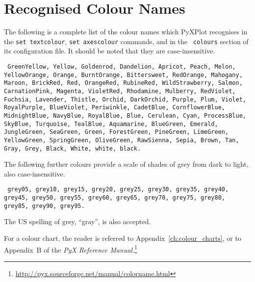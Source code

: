 \section{Recognised Colour Names}
\label{sec:colour_names}

The following is a complete list of the colour names which PyXPlot recognises
in the {\tt set textcolour}, {\tt set axescolour} commands, and in the {\tt
colours} section of its configuration file. It should be noted that they are
case-insensitive.

\vspace{5mm}\noindent
{}
{\tt
GreenYellow, Yellow, Goldenrod, Dandelion, Apricot, Peach, Melon, YellowOrange, Orange, BurntOrange, Bittersweet, RedOrange, Mahogany, Maroon, BrickRed, Red, OrangeRed, RubineRed, WildStrawberry, Salmon, CarnationPink, Magenta, VioletRed, Rhodamine, Mulberry, RedViolet, Fuchsia, Lavender, Thistle, Orchid, DarkOrchid, Purple, Plum, Violet, RoyalPurple, BlueViolet, Periwinkle, CadetBlue, CornflowerBlue, MidnightBlue, NavyBlue, RoyalBlue, Blue, Cerulean, Cyan, ProcessBlue, SkyBlue, Turquoise, TealBlue, Aquamarine, BlueGreen, Emerald, JungleGreen, SeaGreen, Green, ForestGreen, PineGreen, LimeGreen, YellowGreen, SpringGreen, OliveGreen, RawSienna, Sepia, Brown, Tan, Gray, Grey, Black, White, white, black.
}

\vspace{5mm}
The following further colours provide a scale of shades of grey from dark to light, also case-insensitive.

\vspace{5mm}\noindent
{}
{\tt
grey05, grey10, grey15, grey20, grey25, grey30, grey35, grey40, grey45, grey50, grey55, grey60, grey65, grey70, grey75, grey80, grey85, grey90, grey95.
}

\vspace{5mm}\noindent
The US spelling of grey, ``gray'', is also accepted.

For a colour chart, the reader is referred to Appendix~\ref{ch:colour_charts},
or to Appendix~B of the {\it PyX Reference
Manual}.\footnote{\url{http://pyx.sourceforge.net/manual/colorname.html}}

